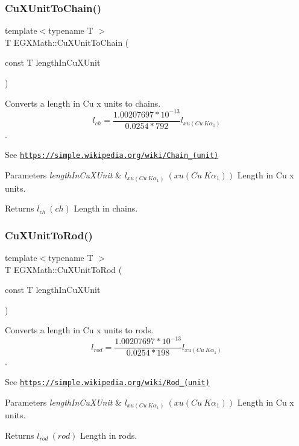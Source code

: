 \subsubsection{\texorpdfstring{Cu\+X\+Unit\+To\+Chain()}{CuXUnitToChain()}}
{\footnotesize\ttfamily template$<$typename T $>$ \\
T E\+G\+X\+Math\+::\+Cu\+X\+Unit\+To\+Chain (\begin{DoxyParamCaption}\item[{const T}]{length\+In\+Cu\+X\+Unit }\end{DoxyParamCaption})}



Converts a length in Cu x units to chains. \[ l_{ch}= \frac{1.00207697*10^{-13}}{0.0254 * 792} l_{xu(Cu\ K\alpha_1)} \]. 

See \href{https://simple.wikipedia.org/wiki/Chain_(unit)}{\tt https\+://simple.\+wikipedia.\+org/wiki/\+Chain\+\_\+(unit)} 
\begin{DoxyParams}{Parameters}
{\em length\+In\+Cu\+X\+Unit} & $ l_{xu(Cu\ K\alpha_1)}\ (xu(Cu\ K\alpha_1))$ Length in Cu x units. \\
\hline
\end{DoxyParams}
\begin{DoxyReturn}{Returns}
$ l_{ch}\ (ch)$ Length in chains. 
\end{DoxyReturn}
\mbox{\label{group___e_g_x_math-_conversions-_length_conversions-_non-_s_i-_cu_x_unit-_surveyors_ga3506ca573e8ba770792a7cf123bceb79}} 
\subsubsection{\texorpdfstring{Cu\+X\+Unit\+To\+Rod()}{CuXUnitToRod()}}
{\footnotesize\ttfamily template$<$typename T $>$ \\
T E\+G\+X\+Math\+::\+Cu\+X\+Unit\+To\+Rod (\begin{DoxyParamCaption}\item[{const T}]{length\+In\+Cu\+X\+Unit }\end{DoxyParamCaption})}



Converts a length in Cu x units to rods. \[ l_{rod}= \frac{1.00207697*10^{-13}}{0.0254 * 198} l_{xu(Cu\ K\alpha_1)} \]. 

See \href{https://simple.wikipedia.org/wiki/Rod_(unit)}{\tt https\+://simple.\+wikipedia.\+org/wiki/\+Rod\+\_\+(unit)} 
\begin{DoxyParams}{Parameters}
{\em length\+In\+Cu\+X\+Unit} & $ l_{xu(Cu\ K\alpha_1)}\ (xu(Cu\ K\alpha_1))$ Length in Cu x units. \\
\hline
\end{DoxyParams}
\begin{DoxyReturn}{Returns}
$ l_{rod}\ (rod)$ Length in rods. 
\end{DoxyReturn}
